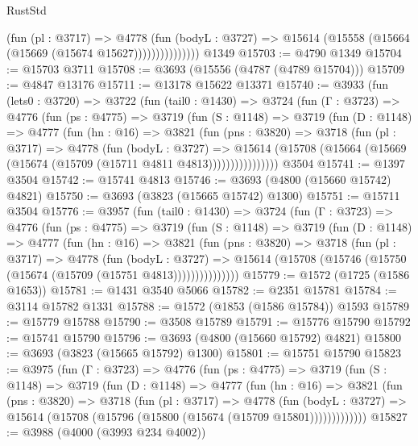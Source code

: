 \begin{lexlean}{RustStd}
\begin{coremodule}
                      (fun (pl : @3717) =>
                      @4778
                        (fun (bodyL : @3727) =>
                        @15614 (@15558 (@15664 (@15669 (@15674 @15627)))))))))))))))
    @1349
@15703 := @4790 @1349
@15704 := @15703 @3711
@15708 := @3693 (@15556 (@4787 (@4789 @15704)))
@15709 := @4847 @13176
@15711 := @13178 @15622 @13371
@15740 := @3933
    (fun (lets0 : @3720) =>
    @3722
      (fun (tail0 : @1430) =>
      @3724
        (fun (Γ : @3723) =>
        @4776
          (fun (ps : @4775) =>
          @3719
            (fun (S : @1148) =>
            @3719
              (fun (D : @1148) =>
              @4777
                (fun (hn : @16) =>
                @3821
                  (fun (pns : @3820) =>
                  @3718
                    (fun (pl : @3717) =>
                    @4778
                      (fun (bodyL : @3727) =>
                      @15614
                        (@15708 (@15664 (@15669 (@15674 (@15709 (@15711 @4811 @4813))))))))))))))))
    @3504
@15741 := @1397 @3504
@15742 := @15741 @4813
@15746 := @3693 (@4800 (@15660 @15742) @4821)
@15750 := @3693 (@3823 (@15665 @15742) @1300)
@15751 := @15711 @3504
@15776 := @3957
    (fun (tail0 : @1430) =>
    @3724
      (fun (Γ : @3723) =>
      @4776
        (fun (ps : @4775) =>
        @3719
          (fun (S : @1148) =>
          @3719
            (fun (D : @1148) =>
            @4777
              (fun (hn : @16) =>
              @3821
                (fun (pns : @3820) =>
                @3718
                  (fun (pl : @3717) =>
                  @4778
                    (fun (bodyL : @3727) =>
                    @15614 (@15708 (@15746 (@15750 (@15674 (@15709 (@15751 @4813)))))))))))))))
@15779 := @1572 (@1725 (@1586 @1653))
@15781 := @1431 @3540 @5066
@15782 := @2351 @15781
@15784 := @3114 @15782 @1331
@15788 := @1572 (@1853 (@1586 @15784)) @1593
@15789 := @15779 @15788
@15790 := @3508 @15789
@15791 := @15776 @15790
@15792 := @15741 @15790
@15796 := @3693 (@4800 (@15660 @15792) @4821)
@15800 := @3693 (@3823 (@15665 @15792) @1300)
@15801 := @15751 @15790
@15823 := @3975
    (fun (Γ : @3723) =>
    @4776
      (fun (ps : @4775) =>
      @3719
        (fun (S : @1148) =>
        @3719
          (fun (D : @1148) =>
          @4777
            (fun (hn : @16) =>
            @3821
              (fun (pns : @3820) =>
              @3718
                (fun (pl : @3717) =>
                @4778
                  (fun (bodyL : @3727) =>
                  @15614 (@15708 (@15796 (@15800 (@15674 (@15709 @15801)))))))))))))
@15827 := @3988 (@4000 (@3993 @234 @4002))

\end{coremodule}
\end{lexlean}
